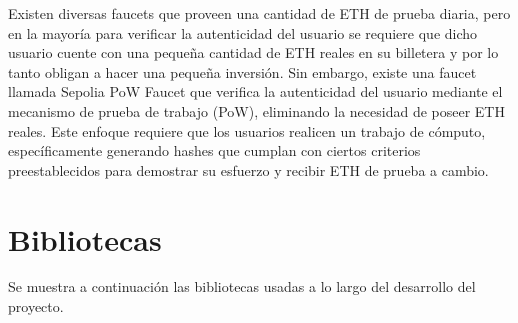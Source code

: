 Existen diversas faucets que proveen una cantidad de ETH de prueba diaria, pero en la mayoría para verificar la autenticidad del usuario se requiere que dicho usuario cuente con una pequeña cantidad de ETH reales en su billetera y por lo tanto obligan a hacer una pequeña inversión.
Sin embargo, existe una faucet llamada Sepolia PoW Faucet que verifica la autenticidad del usuario mediante el mecanismo de prueba de trabajo (PoW), eliminando la necesidad de poseer ETH reales.
Este enfoque requiere que los usuarios realicen un trabajo de cómputo, específicamente generando hashes que cumplan con ciertos criterios preestablecidos para demostrar su esfuerzo y recibir ETH de prueba a cambio. 


\section{Bibliotecas}

Se muestra a continuación las bibliotecas usadas a lo largo del desarrollo del proyecto.

